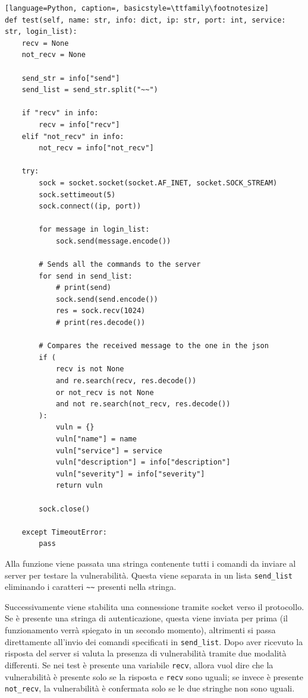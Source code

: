 \documentclass[12pt]{report}
\begin{document}
\begin{lstlisting}[language=Python, caption=, basicstyle=\ttfamily\footnotesize]
def test(self, name: str, info: dict, ip: str, port: int, service: str, login_list):
    recv = None
    not_recv = None

    send_str = info["send"]
    send_list = send_str.split("~~")

    if "recv" in info:
        recv = info["recv"]
    elif "not_recv" in info:
        not_recv = info["not_recv"]

    try:
        sock = socket.socket(socket.AF_INET, socket.SOCK_STREAM)
        sock.settimeout(5)
        sock.connect((ip, port))

        for message in login_list:
            sock.send(message.encode())

        # Sends all the commands to the server
        for send in send_list:
            # print(send)
            sock.send(send.encode())
            res = sock.recv(1024)
            # print(res.decode())

        # Compares the received message to the one in the json
        if (
            recv is not None
            and re.search(recv, res.decode())
            or not_recv is not None
            and not re.search(not_recv, res.decode())
        ):
            vuln = {}
            vuln["name"] = name
            vuln["service"] = service
            vuln["description"] = info["description"]
            vuln["severity"] = info["severity"]
            return vuln

        sock.close()

    except TimeoutError:
        pass
\end{lstlisting}

Alla funzione viene passata una stringa contenente tutti i comandi da inviare al server per testare la vulnerabilità. Questa viene separata in un lista \lstinline{send_list} eliminando i caratteri \lstinline{~~} presenti nella stringa. 

Successivamente viene stabilita una connessione tramite socket verso il protocollo. Se è presente una stringa di autenticazione, questa viene inviata per prima (il funzionamento verrà spiegato in un secondo momento), altrimenti si passa direttamente all'invio dei comandi specificati in \lstinline{send_list}. Dopo aver ricevuto la risposta del server si valuta la presenza di vulnerabilità tramite due modalità differenti. Se nei test è presente una variabile \lstinline{recv}, allora vuol dire che la vulnerabilità è presente solo se la risposta e \lstinline{recv} sono uguali; se invece è presente \lstinline{not_recv}, la vulnerabilità è confermata solo se le due stringhe non sono uguali. 
\end{document}
